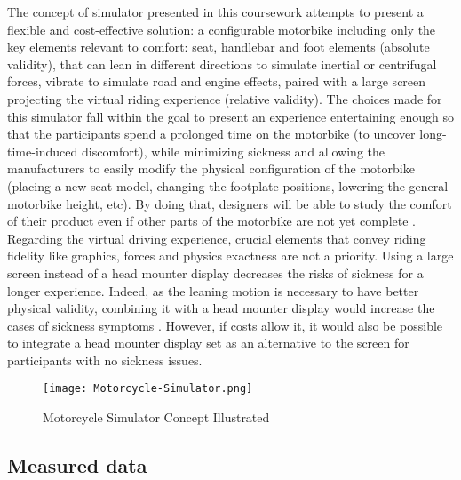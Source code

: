\documentclass[authoryear,preprint]{sigplanconf}
\begin{document}
The concept of simulator presented in this coursework attempts to present a flexible and cost-effective solution: a configurable motorbike including only the key elements relevant to comfort: seat, handlebar and foot elements (absolute validity), that can lean in different directions to simulate inertial or centrifugal forces, vibrate to simulate road and engine effects, paired with a large screen projecting the virtual riding experience  (relative validity). The choices made for this simulator fall within the goal to present an experience entertaining enough so that the participants spend a prolonged time on the motorbike (to uncover long-time-induced discomfort), while minimizing sickness and allowing the manufacturers to easily modify the physical configuration of the motorbike (placing a new seat model, changing the footplate positions, lowering the general motorbike height, etc). By doing that, designers will be able to study the comfort of their product even if other parts of the motorbike are not yet complete \cite{TasksIndustry}. Regarding the virtual driving experience, crucial elements that convey riding fidelity like graphics, forces and physics exactness are not a priority. Using a large screen instead of a head mounter display decreases the risks of sickness for a longer experience. Indeed, as the leaning motion is necessary to have better physical validity, combining it with a head mounter display would increase the cases of sickness symptoms \cite{DiffVRS}. However, if costs allow it, it would also be possible to integrate a head mounter display set as an alternative to the screen for participants with no sickness issues.

\begin{figure}[!h]
\centering
\texttt{[image: Motorcycle-Simulator.png]}
\caption{Motorcycle Simulator Concept Illustrated}
\label{simconcept}
\end{figure}

\subsection{Measured data}
\end{document}
